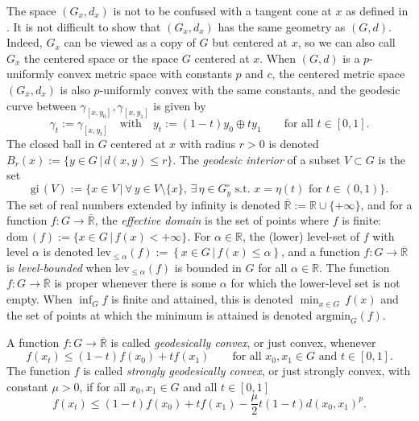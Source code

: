 \documentclass{article}
\theoremstyle{plain}\newtheorem{theorem}{Theorem}[section]
\theoremstyle{plain}\newtheorem{definition}[theorem]{Definition}
\theoremstyle{plain}\newtheorem{lemma}[theorem]{Lemma}
\theoremstyle{definition}\newtheorem{remark}[theorem]{Remark}
\theoremstyle{definition}\newtheorem{example}[theorem]{Example}
\theoremstyle{plain}\newtheorem{proposition}[theorem]{Proposition}
\theoremstyle{plain}\newtheorem{inference}[theorem]{Inference}
\theoremstyle{plain}\newtheorem{corollary}[theorem]{Corollary}
\theoremstyle{plain}\newtheorem{assumption}[theorem]{Assumption}
\newcommand{\set}[2]{\left\{#1\,\left|\,#2\right.\right\}}
\newcommand{\extre}{\overline{\mathbb{R}}}
\begin{document}
The space $(G_x,d_x)$ is not to be confused with a tangent cone at $x$ as defined in \cite[Definition 2.4]{GigNob21}. It is not difficult to show that $(G_x,d_x)$ has the same geometry as $(G,d)$. Indeed, $G_x$ can be viewed as a copy of $G$ but centered at $x$, so we can also call $G_x$ the centered space or the space $G$ centered at $x$. When $(G,d)$ is a $p$-uniformly convex metric space with constants $p$ and $c$, the centered metric space $(G_x,d_x)$ is also $p$-uniformly convex with the same constants, and the geodesic curve between $\gamma_{[x,y_0]},\gamma_{[x,y_1]}$ is given by
\begin{equation}\label{eq: geod btw geods}
    \gamma_t:=\gamma_{[x,y_t]} \quad\text{with}\quad y_t:=(1-t)y_0\oplus ty_1 \qquad\text{for all}\,\,t\in[0,1].
\end{equation}
The closed ball in $G$ centered at $x$ with radius $r>0$ is denoted $B_r(x):=\bigl\{ y\in G \,\big|\, d(x,y)\leq r \bigr\}$. The {\em geodesic interior} of a subset $V\subset G$ is the set
\begin{equation}\label{e:gi}
    \mathrm{gi}\,(V):=\bigl\{ x\in V \,\big|\, \forall\,y\in V\setminus\{x\},\,\exists\,\eta\in G_y^\circ\,\,\text{s.t.}\,\,x=\eta(t)\,\,\text{for}\,\,t\in (0,1) \bigr\}.
\end{equation}
The set of real numbers extended by infinity is denoted  $\extre:=\mathbb{R}\cup\{+\infty\}$, and for a function $f:G\to\extre$, the {\em effective domain} is the set of points where $f$ is finite: $\mathrm{dom}\,(f):=\bigl\{ x\in G \,\big|\, f(x)<+\infty \bigr\}$. For $\alpha\in\mathbb{R}$, the (lower) level-set of $f$ with level $\alpha$ is denoted $\mathrm{lev}_{\leq\alpha}(f):=\set{x\in G}{f(x)\leq\alpha}$, and a function $f:G\to\extre$ is {\em level-bounded} when $\mathrm{lev}_{\leq\alpha}(f)$ is bounded in $G$ for all $\alpha\in\mathbb{R}$. The function $f:G\to\extre$ is proper whenever there is some $\alpha$ for which the lower-level set is not empty. When $\inf_Gf$ is finite and attained, this is denoted $\min_{x\in G}\,f(x)$ and the set of points at which the minimum is attained is denoted $\mathrm{argmin}_G(f)$.

A function $f:G\to\extre$ is called {\em geodesically convex}, or just convex, whenever
$$
f(x_t)\leq (1-t)f(x_0)+tf(x_1) \qquad\text{for all}\,\,x_0,x_1\in G\,\,\text{and}\,\,t\in[0,1].
$$
The function $f$ is called {\em strongly geodesically convex}, or just strongly convex, with constant $\mu>0$, if for all $x_0,x_1\in G$ and all $t\in[0,1]$
\begin{equation}\label{eq: mu-cvx}
    f(x_t)\leq (1-t)f(x_0)+tf(x_1)-\frac{\mu}{2}t(1-t)d(x_0,x_1)^p.
\end{equation}
\end{document}
